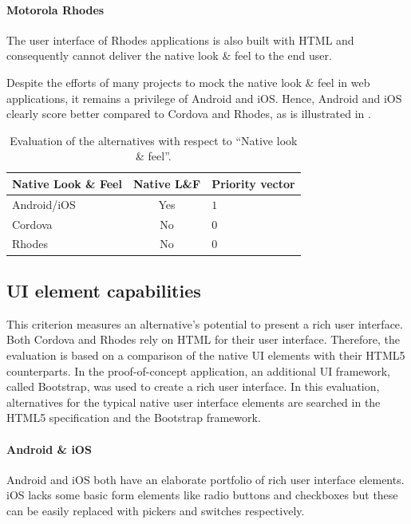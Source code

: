 \paragraph{Motorola Rhodes} The user interface of Rhodes applications is also built with HTML and consequently cannot deliver the native look \& feel to the end user.

Despite the efforts of many projects to mock the native look \& feel in web applications, it remains a privilege of Android and iOS. Hence, Android and iOS clearly score better compared to Cordova and Rhodes, as is illustrated in .

\begin{table}[h!]
    \centering
    \begin{tabular}{lcl}
        \hline
        \textbf{Native Look \& Feel} & Native L\&F & Priority vector \\
        \hline
        Android/iOS                  & Yes         & $1$  \\
        Cordova                      & No          & $0$  \\
        Rhodes                       & No          & $0$  \\
        \hline
    \end{tabular}
    \caption{Evaluation of the alternatives with respect to ``Native look \& feel''.}
    \label{tab:nlf}
\end{table}

\subsection{UI element capabilities}

This criterion measures an alternative's potential to present a rich user interface. Both Cordova and Rhodes rely on HTML for their user interface. Therefore, the evaluation is based on a comparison of the native UI elements with their HTML5 counterparts. In the proof-of-concept application, an additional UI framework, called Bootstrap, was used to create a rich user interface. In this evaluation, alternatives for the typical native user interface elements are searched in the HTML5 specification and the Bootstrap framework.

\paragraph{Android \& iOS} Android and iOS both have an elaborate portfolio of rich user interface elements. iOS lacks some basic form elements like radio buttons and checkboxes but these can be easily replaced with pickers and switches respectively.

